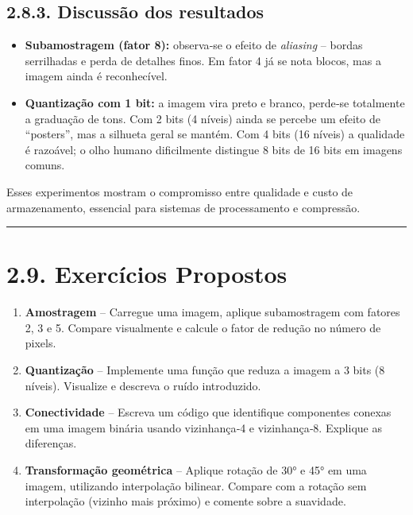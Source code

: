 \documentclass[
  portuguese,
  letterpaper,
  openany,
  oneside,
  12pt,
  a4paper]{book}
\providecommand{\tightlist}{%
  \setlength{\itemsep}{0pt}\setlength{\parskip}{0pt}}
\begin{document}
\begin{tcolorbox}
\subsection{2.8.3. Discussão dos
resultados}\label{discussuxe3o-dos-resultados}

\begin{itemize}
\tightlist
\item
  \textbf{Subamostragem (fator 8):} observa‑se o efeito de
  \emph{aliasing} -- bordas serrilhadas e perda de detalhes finos. Em
  fator 4 já se nota blocos, mas a imagem ainda é reconhecível.
\item
  \textbf{Quantização com 1 bit:} a imagem vira preto e branco, perde‑se
  totalmente a graduação de tons. Com 2 bits (4 níveis) ainda se percebe
  um efeito de ``posters'', mas a silhueta geral se mantém. Com 4 bits
  (16 níveis) a qualidade é razoável; o olho humano dificilmente
  distingue 8 bits de 16 bits em imagens comuns.
\end{itemize}

Esses experimentos mostram o compromisso entre qualidade e custo de
armazenamento, essencial para sistemas de processamento e compressão.

\begin{center}\rule{0.5\linewidth}{0.5pt}\end{center}

\section{2.9. Exercícios Propostos}\label{exercuxedcios-propostos}

\begin{enumerate}
\def\labelenumi{\arabic{enumi}.}
\tightlist
\item
  \textbf{Amostragem} -- Carregue uma imagem, aplique subamostragem com
  fatores 2, 3 e 5. Compare visualmente e calcule o fator de redução no
  número de pixels.
\item
  \textbf{Quantização} -- Implemente uma função que reduza a imagem a 3
  bits (8 níveis). Visualize e descreva o ruído introduzido.
\item
  \textbf{Conectividade} -- Escreva um código que identifique
  componentes conexas em uma imagem binária usando vizinhança‑4 e
  vizinhança‑8. Explique as diferenças.
\item
  \textbf{Transformação geométrica} -- Aplique rotação de 30° e 45° em
  uma imagem, utilizando interpolação bilinear. Compare com a rotação
  sem interpolação (vizinho mais próximo) e comente sobre a suavidade.
\end{enumerate}


\end{tcolorbox}
\end{document}
